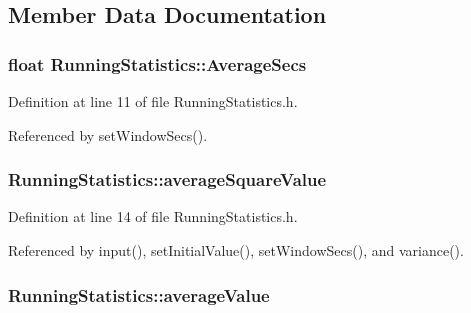 \subsection{Member Data Documentation}
\subsubsection[{\texorpdfstring{Average\+Secs}{AverageSecs}}]{\setlength{\rightskip}{0pt plus 5cm}float Running\+Statistics\+::\+Average\+Secs}\hypertarget{struct_running_statistics_a4ec83fcbddff87169b6aad7fe9784fad}{}\label{struct_running_statistics_a4ec83fcbddff87169b6aad7fe9784fad}


Definition at line 11 of file Running\+Statistics.\+h.



Referenced by set\+Window\+Secs().

\subsubsection[{\texorpdfstring{average\+Square\+Value}{averageSquareValue}}]{ Running\+Statistics\+::average\+Square\+Value}\hypertarget{struct_running_statistics_afeb370b47574823deb2eef8e81da7330}{}\label{struct_running_statistics_afeb370b47574823deb2eef8e81da7330}


Definition at line 14 of file Running\+Statistics.\+h.



Referenced by input(), set\+Initial\+Value(), set\+Window\+Secs(), and variance().

\subsubsection[{\texorpdfstring{average\+Value}{averageValue}}]{ Running\+Statistics\+::average\+Value}\hypertarget{struct_running_statistics_af4029c4a1059b7dccacf846f71060c04}{}\label{struct_running_statistics_af4029c4a1059b7dccacf846f71060c04}


